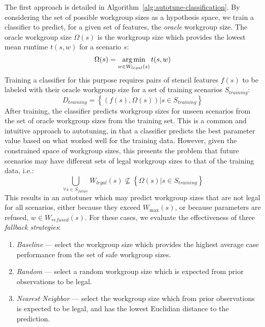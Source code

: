   The first approach is detailed in
  Algorithm~\ref{alg:autotune-classification}. By considering the set of
  possible workgroup sizes as a hypothesis space, we train a classifier
  to predict, for a given set of features, the \emph{oracle} workgroup
  size. The oracle workgroup size $\Omega(s)$ is the workgroup size
  which provides the lowest mean runtime $t(s,w)$ for a scenario $s$:
  \begin{equation}
    \Omega(s) = \operatorname*{arg\,min}_{w \in W_{legal}(s)} t(s,w)
  \end{equation}
  Training a classifier for this purpose requires pairs of stencil
  features $f(s)$ to be labeled with their oracle workgroup size for a
  set of training scenarios $S_{training}$:
  \begin{equation}
    D_{training} = \left\{ \left(f(s), \Omega(s)\right) | s \in S_{training} \right\}
  \end{equation}
  After training, the classifier predicts workgroup sizes for unseen
  scenarios from the set of oracle workgroup sizes from the training
  set. This is a common and intuitive approach to autotuning, in that a
  classifier predicts the best parameter value based on what worked well
  for the training data. However, given the constrained space of
  workgroup sizes, this presents the problem that future scenarios may
  have different sets of legal workgroup sizes to that of the training
  data, i.e.:
  \begin{equation}
    \bigcup_{\forall s \in S_{future}} W_{legal}(s) \nsubseteq \left\{ \Omega(s) | s \in S_{training} \right\}
  \end{equation}
  This results in an autotuner which may predict workgroup sizes that
  are not legal for all scenarios, either because they exceed
  $W_{\max}(s)$, or because parameters are refused,
  $w \in W_{refused}(s)$. For these cases, we evaluate the effectiveness
  of three \emph{fallback strategies}:
  \begin{enumerate}
    \item \emph{Baseline} --- select the workgroup size which provides the
    highest average case performance from the set of safe workgroup sizes.
    \item \emph{Random} --- select a random workgroup size which is
    expected from prior observations to be legal.
    \item \emph{Nearest Neighbor} --- select the workgroup size which
    from prior observations is expected to be legal, and has the lowest
    Euclidian distance to the prediction.
  \end{enumerate}


